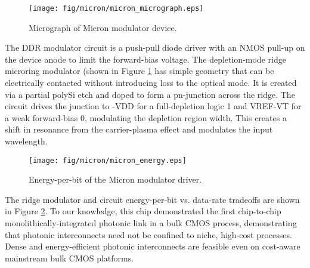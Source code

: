 	\begin{figure}[H]
		\begin{center}
			\texttt{[image: fig/micron/micron\_micrograph.eps]}
			\caption{\label{fig:micron_micrograph} Micrograph of Micron modulator device.}
		\end{center}
	\end{figure}


The DDR modulator circuit is a push-pull diode driver with an NMOS pull-up on the device anode to limit the forward-bias voltage. The depletion-mode ridge microring modulator (shown in Figure \ref{fig:micron_micrograph} has simple geometry that can be electrically contacted without introducing loss to the optical mode. It is created via a partial polySi etch and doped to form a pn-junction across the ridge. The circuit drives the junction to -VDD for a full-depletion logic 1 and VREF-VT for a weak forward-bias 0, modulating the depletion region width. This creates a shift in resonance from the carrier-plasma effect and modulates the input wavelength.



	\begin{figure}[H]
		\begin{center}
			\texttt{[image: fig/micron/micron\_energy.eps]}
			\caption{\label{fig:micron_energy} Energy-per-bit of the Micron modulator driver.}
		\end{center}
	\end{figure}



The ridge modulator and circuit energy-per-bit vs. data-rate tradeoffs are shown in Figure \ref{fig:micron_energy}.  To our knowledge, this chip demonstrated the first chip-to-chip monolithically-integrated photonic link in a bulk CMOS process, demonstrating that photonic interconnects need not be confined to niche, high-cost processes. Dense and energy-efficient photonic interconnects are feasible even on cost-aware mainstream bulk CMOS platforms. 



